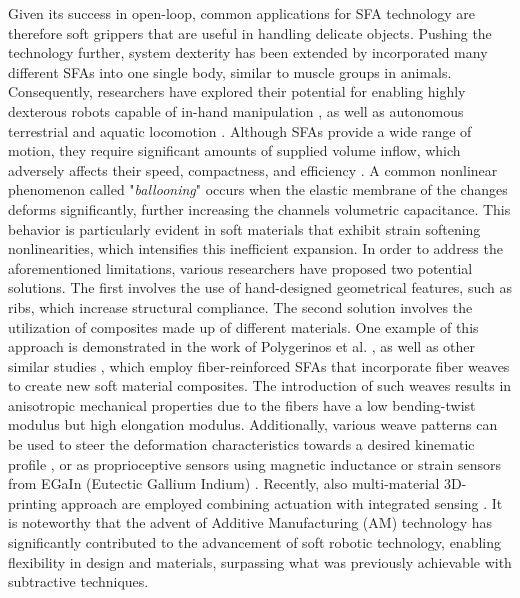 Given its success in open-loop, common applications for SFA technology are therefore soft grippers \cite{Galloway2016,Hughes2016Nov,Ansari2022Sep,Teleshev1981} that are useful in handling delicate objects. Pushing the technology further, system dexterity has been extended by incorporated many different SFAs into one single body, similar to muscle groups in animals. Consequently, researchers have explored their potential for enabling highly dexterous robots capable of in-hand manipulation \cite{Suzumori1991,Graule2022}, as well as autonomous terrestrial and aquatic locomotion \cite{Choi2011,Katzschmann2018,Drotman2017,Suzumori1992}. Although SFAs provide a wide range of motion, they require significant amounts of supplied volume inflow, which adversely affects their speed, compactness, and efficiency \cite{Overvelde2015Sep,Rus2015,Xavier2022Jun}. A common nonlinear phenomenon called "\emph{ballooning}" occurs when the elastic membrane of the changes deforms significantly, further increasing the channels volumetric capacitance. This behavior is particularly evident in soft materials that exhibit strain softening nonlinearities, which intensifies this inefficient expansion. In order to address the aforementioned limitations, various researchers have proposed two potential solutions. The first involves the use of hand-designed geometrical features, such as ribs, which increase structural compliance. The second solution involves the utilization of composites made up of different materials. One example of this approach is demonstrated in the work of Polygerinos et al. \cite{Polygerinos2015,Polygerinos2013}, as well as other similar studies \cite{Fras2018Oct,Suzumori1991,Cianchetti2013Nov,Cianchetti2013Nov}, which employ fiber-reinforced SFAs that incorporate fiber weaves to create new soft material composites. The introduction of such weaves results in anisotropic mechanical properties due to the fibers have a low bending-twist modulus but high elongation modulus. Additionally, various weave patterns can be used to steer the deformation characteristics towards a desired kinematic profile \cite{Kim2019Aug,Connolly2017Jan}, or as proprioceptive sensors using magnetic inductance \cite{Felt2019Feb,Felt2015Oct} or strain sensors from EGaIn (Eutectic Gallium Indium) \cite{Park2012}. Recently, also multi-material 3D-printing approach are employed combining actuation with integrated sensing \cite{Wolterink2022Oct,Zhou2021Apr}. It is noteworthy that the advent of Additive Manufacturing (AM) technology has significantly contributed to the advancement of soft robotic technology, enabling flexibility in design and materials, surpassing what was previously achievable with subtractive techniques.

